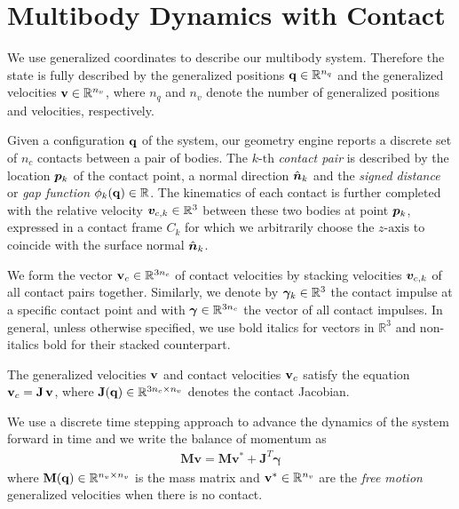 \section{Multibody Dynamics with Contact}
\label{sec:multibody_dynamics_with_contact}

We use generalized coordinates to describe our multibody system. Therefore the
state is fully described by the generalized positions
${\mathbf{q}}\in\mathbb{R}^{n_q}$ and the generalized velocities
${\mathbf{v}}\in\mathbb{R}^{n_v}$, where $n_q$ and $n_v$ denote the number of
generalized positions and velocities, respectively.

Given a configuration ${\mathbf{q}}$ of the system, our geometry engine reports a
discrete set of $n_c$ contacts between a pair of bodies. The $k\text{-th}$
\emph{contact pair} is described by the location ${\bm{p}}_k$ of the contact
point, a normal direction $\hat{{\bm{n}}}_k$ and the \emph{signed distance} or
\emph{gap function} $\phi_k({\mathbf{q}})\in\mathbb{R}$. The kinematics of each
contact is further completed with the relative velocity
${\bm{v}}_{c,k}\in\mathbb{R}^3$ between these two bodies at point ${\bm{p}}_k$,
expressed in a contact frame $C_k$ for which we arbitrarily choose the
$z\text{-axis}$ to coincide with the surface normal $\hat{{\bm{n}}}_k$. 

We form the vector ${\mathbf{v}}_{c}\in\mathbb{R}^{3n_c}$ of contact velocities by
stacking velocities ${\bm{v}}_{c,k}$ of all contact pairs together. Similarly, we
denote by ${\bm\gamma}_k\in\mathbb{R}^3$ the contact impulse at a specific contact
point and with ${\bm\gamma}\in\mathbb{R}^{3n_c}$ the vector of all contact impulses.
In general, unless otherwise specified, we use bold italics for vectors in
$\mathbb{R}^3$ and non-italics bold for their stacked counterpart.

The generalized velocities ${\mathbf{v}}$ and contact velocities ${\mathbf{v}}_c$ satisfy
the equation ${\mathbf{v}}_c={\mathbf{J}}\,{\mathbf{v}}$, where
${\mathbf{J}}({\mathbf{q}})\in\mathbb{R}^{3n_c\times n_v}$ denotes the contact Jacobian.

We use a discrete time stepping approach to advance the dynamics of the system
forward in time and we write the balance of momentum as
\begin{eqnarray}
	\mathbf{M}\mathbf{v} = \mathbf{M}\mathbf{v}^* + \mathbf{J}^T\mathbf{\gamma}
	\label{eq:momentum_balance}
\end{eqnarray}
where ${\mathbf{M}}({\mathbf{q}})\in\mathbb{R}^{n_v\times n_v}$ is the mass matrix and
${\mathbf{v}}^*\in\mathbb{R}^{n_v}$ are the \textit{free motion} generalized
velocities when there is no contact.

